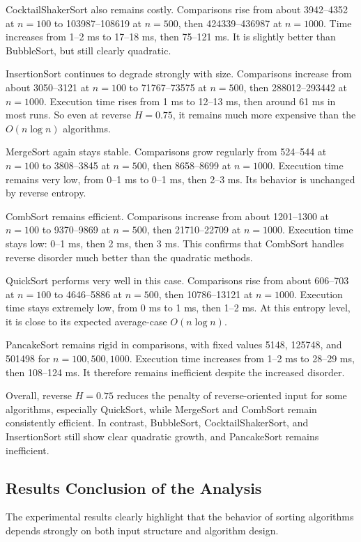 \documentclass{article}
\begin{document}
CocktailShakerSort also remains costly. Comparisons rise from about 3942--4352 at $n=100$ to 103987--108619 at $n=500$, then 424339--436987 at $n=1000$. Time increases from 1--2 ms to 17--18 ms, then 75--121 ms. It is slightly better than BubbleSort, but still clearly quadratic.

InsertionSort continues to degrade strongly with size. Comparisons increase from about 3050--3121 at $n=100$ to 71767--73575 at $n=500$, then 288012--293442 at $n=1000$. Execution time rises from 1 ms to 12--13 ms, then around 61 ms in most runs. So even at reverse $H=0.75$, it remains much more expensive than the $O(n \log n)$ algorithms.

MergeSort again stays stable. Comparisons grow regularly from 524--544 at $n=100$ to 3808--3845 at $n=500$, then 8658--8699 at $n=1000$. Execution time remains very low, from 0--1 ms to 0--1 ms, then 2--3 ms. Its behavior is unchanged by reverse entropy.

CombSort remains efficient. Comparisons increase from about 1201--1300 at $n=100$ to 9370--9869 at $n=500$, then 21710--22709 at $n=1000$. Execution time stays low: 0--1 ms, then 2 ms, then 3 ms. This confirms that CombSort handles reverse disorder much better than the quadratic methods.

QuickSort performs very well in this case. Comparisons rise from about 606--703 at $n=100$ to 4646--5886 at $n=500$, then 10786--13121 at $n=1000$. Execution time stays extremely low, from 0 ms to 1 ms, then 1--2 ms. At this entropy level, it is close to its expected average-case $O(n \log n)$.

PancakeSort remains rigid in comparisons, with fixed values 5148, 125748, and 501498 for $n=100,500,1000$. Execution time increases from 1--2 ms to 28--29 ms, then 108--124 ms. It therefore remains inefficient despite the increased disorder.

Overall, reverse $H=0.75$ reduces the penalty of reverse-oriented input for some algorithms, especially QuickSort, while MergeSort and CombSort remain consistently efficient. In contrast, BubbleSort, CocktailShakerSort, and InsertionSort still show clear quadratic growth, and PancakeSort remains inefficient.



\subsection{Results Conclusion of the Analysis}

The experimental results clearly highlight that the behavior of sorting algorithms depends strongly on both input structure and algorithm design.
\end{document}
